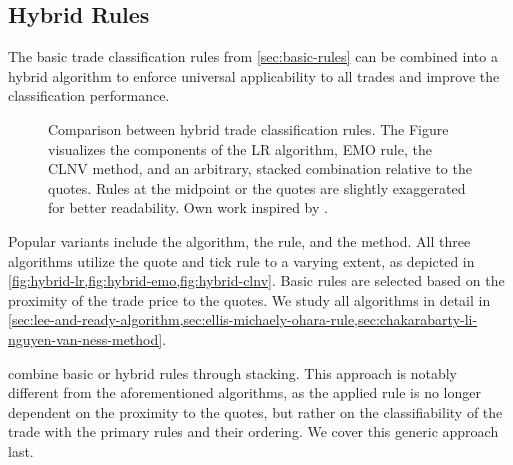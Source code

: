 \subsection{Hybrid Rules}\label{sec:hybrid-rules}

The basic trade classification rules from \cref{sec:basic-rules} can be combined into a hybrid algorithm to enforce universal applicability to all trades and improve the classification performance.


\begin{figure}[ht!]
  \hfill%
  \hfill%
  \hfill%
  \caption[Comparison Between Hybrid Trade Classification Rules]{Comparison between hybrid trade classification rules. The Figure visualizes the components of the \acrshort{LR} algorithm, \acrshort{EMO} rule, the \acrshort{CLNV} method, and an arbitrary, stacked combination relative to the quotes. Rules at the midpoint or the quotes are slightly exaggerated for better readability. Own work inspired by \textcite[][167]{poppeSensitivityVPINChoice2016}.}
  \label{fig:hybrid-algorithms}
\end{figure}

Popular variants include the  algorithm, the  rule, and the  method. All three algorithms utilize the quote and tick rule to a varying extent, as depicted in \cref{fig:hybrid-lr,fig:hybrid-emo,fig:hybrid-clnv}. Basic rules are selected based on the proximity of the trade price to the quotes. We study all algorithms in detail in \cref{sec:lee-and-ready-algorithm,sec:ellis-michaely-ohara-rule,sec:chakarabarty-li-nguyen-van-ness-method}.

\textcite[][18]{grauerOptionTradeClassification2022} combine basic or hybrid rules through stacking. This approach is notably different from the aforementioned algorithms, as the applied rule is no longer dependent on the proximity to the quotes, but rather on the classifiability of the trade with the primary rules and their ordering. We cover this generic approach last.
